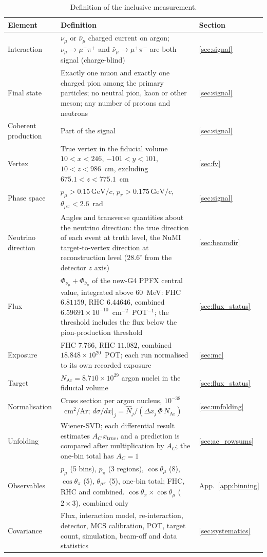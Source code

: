\documentclass[11pt,a4paper]{article}
\newcommand{\GeVc}{\,\text{GeV}\!/c}
\begin{document}
\begin{table}[H]
  \centering
  \caption{Definition of the inclusive measurement.}
  \label{tab:measdef}
  \footnotesize
  \begin{tabular}{@{}p{3.1cm}p{9.9cm}p{1.5cm}@{}}
    \toprule
    Element & Definition & Section \\
    \midrule
    Interaction & $\nu_\mu$ or $\bar\nu_\mu$ charged current on argon; $\nu_\mu\to\mu^-\pi^+$ and
      $\bar\nu_\mu\to\mu^+\pi^-$ are both signal (charge-blind) & \ref{sec:signal} \\
    Final state & Exactly one muon and exactly one charged pion among the primary particles; no neutral
      pion, kaon or other meson; any number of protons and neutrons & \ref{sec:signal} \\
    Coherent production & Part of the signal & \ref{sec:signal} \\
    Vertex & True vertex in the fiducial volume $10<x<246$, $-101<y<101$, $10<z<986$~cm, excluding
      $675.1<z<775.1$~cm & \ref{sec:fv} \\
    Phase space & $p_\mu>0.15\GeVc$, $p_\pi>0.175\GeVc$, $\theta_{\mu\pi}<2.6$~rad & \ref{sec:signal} \\
    Neutrino direction & Angles and transverse quantities about the neutrino direction: the true direction
      of each event at truth level, the NuMI target-to-vertex direction at reconstruction level
      ($28.6^\circ$ from the detector $z$ axis) & \ref{sec:beamdir} \\
    Flux & $\Phi_{\nu_\mu}+\Phi_{\bar\nu_\mu}$ of the new-G4 PPFX central value, integrated above
      $60$~MeV: FHC $6.81159$, RHC $6.44646$, combined $6.59691\times10^{-10}$~cm$^{-2}$~POT$^{-1}$; the
      threshold includes the flux below the pion-production threshold & \ref{sec:flux_status} \\
    Exposure & FHC $7.766$, RHC $11.082$, combined $18.848\times10^{20}$~POT; each run normalised to its
      own recorded exposure & \ref{sec:mc} \\
    Target & $N_\mathrm{Ar}=8.710\times10^{29}$ argon nuclei in the fiducial volume & \ref{sec:flux_status} \\
    Normalisation & Cross section per argon nucleus, $10^{-38}$~cm$^2$/Ar;
      $d\sigma/dx|_j=\hat N_j/(\Delta x_j\,\Phi\,N_\mathrm{Ar})$ & \ref{sec:unfolding} \\
    Unfolding & Wiener-SVD; each differential result estimates $A_C\,x_\mathrm{true}$, and a prediction is
      compared after multiplication by $A_C$; the one-bin total has $A_C=1$ & \ref{sec:ac_rowsums} \\
    Observables & $p_\mu$ (5 bins), $p_\pi$ (3 regions), $\cos\theta_\mu$ (8), $\cos\theta_\pi$ (5),
      $\theta_{\mu\pi}$ (5), one-bin total; FHC, RHC and combined. $\cos\theta_\pi\times\cos\theta_\mu$
      ($2\times3$), combined only & App.~\ref{app:binning} \\
    Covariance & Flux, interaction model, re-interaction, detector, MCS calibration, POT, target
      count, simulation, beam-off and data statistics & \ref{sec:systematics} \\
    \bottomrule
  \end{tabular}
\end{table}
\end{document}
